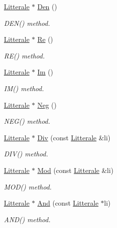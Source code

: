 \begin{DoxyCompactItemize}
\hyperlink{class_litterale}{Litterale} $\ast$ \hyperlink{class_li_expression_ab135c92b3d0378fea00a60f096fab7d6}{Den} ()
\begin{DoxyCompactList}\small\item\em D\+E\+N() method. \end{DoxyCompactList}\item 
\hyperlink{class_litterale}{Litterale} $\ast$ \hyperlink{class_li_expression_ae1a4046463009818bd96794ba65bd6b4}{Re} ()
\begin{DoxyCompactList}\small\item\em R\+E() method. \end{DoxyCompactList}\item 
\hyperlink{class_litterale}{Litterale} $\ast$ \hyperlink{class_li_expression_ac9f9dae0e22ae52c5c8e92a3b4dc6a2a}{Im} ()
\begin{DoxyCompactList}\small\item\em I\+M() method. \end{DoxyCompactList}\item 
\hyperlink{class_litterale}{Litterale} $\ast$ \hyperlink{class_li_expression_a0bf45253ed1ac7d76d0950f5368f634c}{Neg} ()
\begin{DoxyCompactList}\small\item\em N\+E\+G() method. \end{DoxyCompactList}\item 
\hyperlink{class_litterale}{Litterale} $\ast$ \hyperlink{class_li_expression_afc9c8a7d8d16b6b834708daa1c8bb431}{Div} (const \hyperlink{class_litterale}{Litterale} \&li)
\begin{DoxyCompactList}\small\item\em D\+I\+V() method. \end{DoxyCompactList}\item 
\hyperlink{class_litterale}{Litterale} $\ast$ \hyperlink{class_li_expression_adb379aef8c3782698a76bc56d0c6758d}{Mod} (const \hyperlink{class_litterale}{Litterale} \&li)
\begin{DoxyCompactList}\small\item\em M\+O\+D() method. \end{DoxyCompactList}\item 
\hyperlink{class_litterale}{Litterale} $\ast$ \hyperlink{class_li_expression_a6e29f5bd106989a72e8096d3481fd326}{And} (const \hyperlink{class_litterale}{Litterale} $\ast$li)
\begin{DoxyCompactList}\small\item\em A\+N\+D() method. \end{DoxyCompactList}\item 

\end{DoxyCompactItemize}
